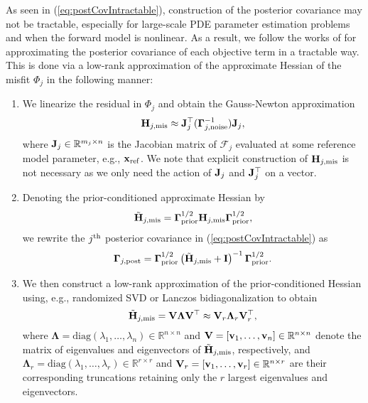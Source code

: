 \documentclass[11pt]{article}          %
\newcommand{\bfv}{ {\bf{v}}}
\newcommand{\bbR}{\mathbb{R}}
\newcommand{\bfJ}{{\bf J}}
\newcommand{\bfV}{{\bf V}}
\newcommand{\bfI}{{\bf I}}
\newcommand{\bfH}{{\bf H}}
\newcommand{\bfx}{{\bf  x}}
\begin{document}
As seen in (\ref{eq:postCovIntractable}), construction of the posterior covariance may not be tractable, especially for large-scale PDE parameter estimation problems and when the forward model is nonlinear. As a result, we follow the works of \cite{flath2011fast} for approximating the posterior covariance of each objective term in a tractable way. This is done via a low-rank approximation of the approximate Hessian of the misfit $\Phi_j$ in the following manner:
\begin{enumerate}
  \item We linearize the residual in $\Phi_j$ and obtain the Gauss-Newton approximation
  \begin{align}
  \bfH_{j, \rm mis} \approx \bfJ_j^\top (\boldsymbol{\Gamma}_{j, \rm noise}^{-1}) \bfJ_j,
  \end{align} 
  where $\bfJ_j \in \bbR^{m_j \times n}$ is the Jacobian matrix of $\mathcal{F}_j$ evaluated at some reference model parameter, e.g., $\bfx_{\rm ref}$. We note that explicit construction of $\bfH_{j, \rm mis}$ is not necessary as we only need the action of $\bfJ_j$ and $\bfJ_j^\top$ on a vector.
  \item Denoting the prior-conditioned approximate Hessian by $$\tilde{\bfH}_{j, \rm mis} = \boldsymbol{\Gamma}^{1/2}_{\rm prior} \bfH_{j, \rm mis} \boldsymbol{\Gamma}^{1/2}_{\rm prior},$$ we rewrite the $j^{\rm th}$ posterior covariance in (\ref{eq:postCovIntractable}) as
    \begin{equation}
    \label{eq:tempGammaPost}
      \boldsymbol{\Gamma}_{j, \rm post} = \boldsymbol{\Gamma}_{\rm prior}^{1/2} \left(\tilde{\bfH}_{j, \rm mis} + \bfI\right)^{-1} \boldsymbol{\Gamma}_{\rm prior}^{1/2}.
    \end{equation}
  \item We then construct a low-rank approximation of the prior-conditioned Hessian using, e.g., randomized SVD \cite{saibaba2016randomized} or Lanczos bidiagonalization \cite{golub2012matrix} to obtain
    \begin{equation}
      \tilde{\bfH}_{j, \rm mis} = \bfV \boldsymbol{\Lambda} \bfV^\top \approx \bfV_r \boldsymbol{\Lambda}_r \bfV_r^\top,
    \end{equation}
    where $\boldsymbol{\Lambda} = \text{diag}(\lambda_1,\ldots,\lambda_n) \in \bbR^{n \times n}$ and $\bfV = [ \bfv_1,\ldots, \bfv_n ] \in \bbR^{n \times n}$ denote the matrix of eigenvalues and eigenvectors of $\tilde{\bfH}_{j, \rm mis}$, respectively, and $\boldsymbol{\Lambda}_r = \text{diag}(\lambda_1,\ldots,\lambda_r) \in \bbR^{r \times r}$ and $\bfV_r =  [ \bfv_1,\ldots, \bfv_r ] \in \bbR^{n \times r}$ are their corresponding truncations retaining only the $r$ largest eigenvalues and eigenvectors.

\end{enumerate}
\end{document}
